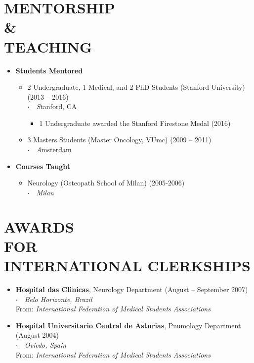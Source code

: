 \documentclass[line,margin]{res}
\newcommand{\placestyle}[1]{\footnotesize $\cdot$\ \ {\emph{#1}}}
\newcommand{\datestyle}[1]{{\tiny \dotfill} {\small (#1)}}
\begin{document}
\begin{resume}
\section{MENTORSHIP \\ \& \\ TEACHING}
\begin{itemize}
  \item {
    {\bf Students Mentored}
    \begin{itemize}
      \item 2 Undergraduate, 1 Medical, and 2 PhD Students (Stanford University) \datestyle{2013 -- 2016} \\
        {\placestyle Stanford, CA}
        \begin{itemize}
          \item 1 Undergraduate awarded the Stanford Firestone Medal \datestyle{2016}
        \end{itemize}
      \item 3 Masters Students (Master Oncology, VUmc)  \datestyle{2009 -- 2011} \\
        {\placestyle Amsterdam}
    \end{itemize}
  }
  \item {
    {\bf Courses Taught}
    \begin{itemize}
      \item Neurology (Osteopath School of Milan) \datestyle{2005-2006} \\
        {\placestyle{Milan}}
    \end{itemize}
  }

\end{itemize}

\newpage
\section{AWARDS \\ FOR \\ INTERNATIONAL CLERKSHIPS}
\begin{itemize}
\item {\bf Hospital das Clinicas}, Neurology Department \datestyle{August -- September 2007} \\
  { \placestyle{Belo Horizonte, Brazil} } \\
  { \small From: \emph{International Federation of Medical Students Associations} }
\item {\bf Hospital Universitario Central de Asturias}, Pnumology Department \datestyle{August 2004} \\
  { \placestyle{Oviedo, Spain} } \\
  { \small From: \emph{International Federation of Medical Students Associations} }
\end{itemize}


\end{resume}
\end{document}
